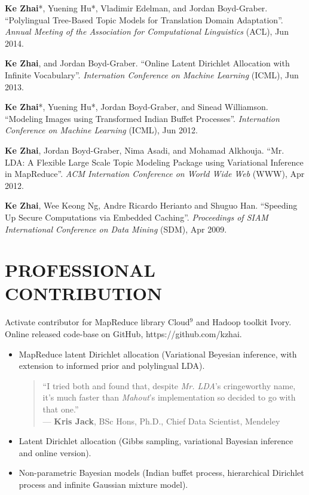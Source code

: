 \documentclass{style/resume}
\begin{document}
\begin{resume}
  {\bf Ke Zhai}*, Yuening Hu*, Vladimir Edelman, and Jordan
  Boyd-Graber. ``Polylingual Tree-Based Topic Models for Translation
  Domain Adaptation''. {\it Annual Meeting of the Association for
    Computational Linguistics} (ACL), Jun 2014.

  {\bf Ke Zhai}, and Jordan Boyd-Graber. ``Online Latent Dirichlet
  Allocation with Infinite Vocabulary''. {\it Internation Conference
    on Machine Learning} (ICML), Jun 2013.

  {\bf Ke Zhai}*, Yuening Hu*, Jordan Boyd-Graber, and Sinead
  Williamson. ``Modeling Images using Transformed Indian Buffet
  Processes''. {\it Internation Conference on Machine Learning}
  (ICML), Jun 2012.

  {\bf Ke Zhai}, Jordan Boyd-Graber, Nima Asadi, and Mohamad
  Alkhouja. ``Mr. LDA: A Flexible Large Scale Topic Modeling Package
  using Variational Inference in MapReduce''. {\it ACM Internation
    Conference on World Wide Web} (WWW), Apr 2012.

  {\bf Ke Zhai}, Wee Keong Ng, Andre Ricardo Herianto and Shuguo
  Han. ``Speeding Up Secure Computations via Embedded Caching''. {\it
    Proceedings of SIAM International Conference on Data Mining}
  (SDM), Apr 2009.

  \section{PROFESSIONAL CONTRIBUTION}
  \vspace{0.1in}
  Activate contributor for MapReduce library Cloud$^9$ and Hadoop toolkit Ivory.\\
  Online released code-base on GitHub, https://github.com/kzhai.
  \begin{itemize}
  \item MapReduce latent Dirichlet allocation (Variational Beyesian
    inference, with extension to informed prior and polylingual LDA).
    \begin{quotation}
      ``I tried both and found that, despite \emph{Mr. LDA}'s cringeworthy name, it's much faster than \emph{Mahout}'s implementation so decided to go with that one.''\\
      \vspace{1mm}
      \hfill --- \textbf{Kris Jack}, BSc Hons, Ph.D., Chief Data Scientist, Mendeley
    \end{quotation}
  \item Latent Dirichlet allocation (Gibbs sampling, variational Bayesian inference and online version).
  \item Non-parametric Bayesian models (Indian buffet process, hierarchical Dirichlet process and infinite Gaussian mixture model).
  \end{itemize}


\end{resume}
\end{document}
